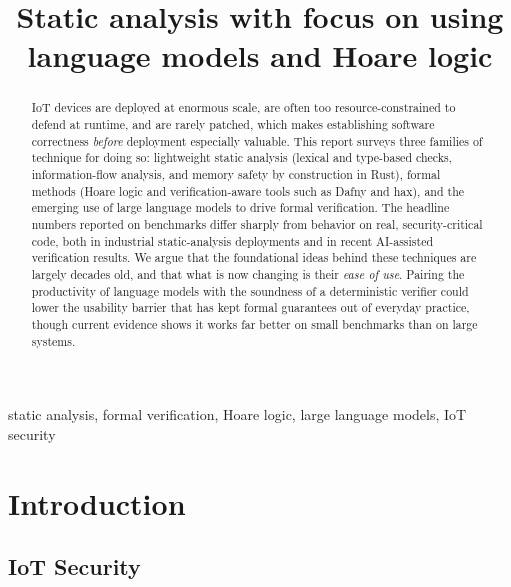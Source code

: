 \documentclass[conference]{IEEEtran}
\begin{document}
\title{Static analysis with focus on using language models and Hoare logic\\
}

\author{
}

\maketitle
\pagestyle{plain}
\thispagestyle{plain}

\begin{abstract}
IoT devices are deployed at enormous scale, are often too resource-constrained to defend at runtime, and are rarely patched, which makes establishing software correctness \emph{before} deployment especially valuable. This report surveys three families of technique for doing so: lightweight static analysis (lexical and type-based checks, information-flow analysis, and memory safety by construction in Rust), formal methods (Hoare logic and verification-aware tools such as Dafny and hax), and the emerging use of large language models to drive formal verification. The headline numbers reported on benchmarks differ sharply from behavior on real, security-critical code, both in industrial static-analysis deployments and in recent AI-assisted verification results. We argue that the foundational ideas behind these techniques are largely decades old, and that what is now changing is their \emph{ease of use}. Pairing the productivity of language models with the soundness of a deterministic verifier could lower the usability barrier that has kept formal guarantees out of everyday practice, though current evidence shows it works far better on small benchmarks than on large systems.
\end{abstract}

\begin{IEEEkeywords}
static analysis, formal verification, Hoare logic, large language models, IoT security
\end{IEEEkeywords}


\section{Introduction}

\subsection{IoT Security}
\end{document}
